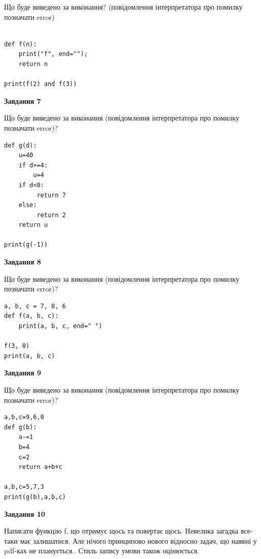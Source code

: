 \documentclass[12pt, ukrainian]{article}
\begin{document}
{\begin {large}
Що буде виведено за виконання? (повідомлення інтерпретатора про помилку позначати error)\par
\begin{verbatim}

def f(n):
    print("f", end="");
    return n

print(f(2) and f(3))
\end{verbatim}

{\begin {center}\textbf{Завдання 7}\end {center}}

Що буде виведено за виконання (повідомлення інтерпретатора про помилку позначати error)?\par
\begin{verbatim}
def g(d):
    u=40
    if d>=4: 
        u=4
    if d<0:
         return 7
    else:
         return 2
    return u

print(g(-1))
\end{verbatim}

{\begin {center}\textbf{Завдання 8}\end {center}}

Що буде виведено за виконання (повідомлення інтерпретатора про помилку позначати error)?\par
\begin{verbatim}
a, b, c = 7, 8, 6
def f(a, b, c):
    print(a, b, c, end=" ")

f(3, 0)
print(a, b, c)
\end{verbatim}

{\begin {center}\textbf{Завдання 9}\end {center}}

Що буде виведено за виконання (повідомлення інтерпретатора про помилку позначати error)?\par
\begin{verbatim}
a,b,c=9,6,0
def g(b):
    a-=1
    b=4
    c=2
    return a+b+c

a,b,c=5,7,3
print(g(b),a,b,c)
\end{verbatim}

{\begin {center}\textbf{Завдання 10}\end {center}}


Написати функцiю f, що отримує щось та повертає щось. Невелика загадка все-таки має залишатися. Але нічого принципово нового відносно задач, що наявні у pdf-ках не планується.. Стиль запису умови також оцінюється.\par
\end {large}}
\newpage
\end{document}
